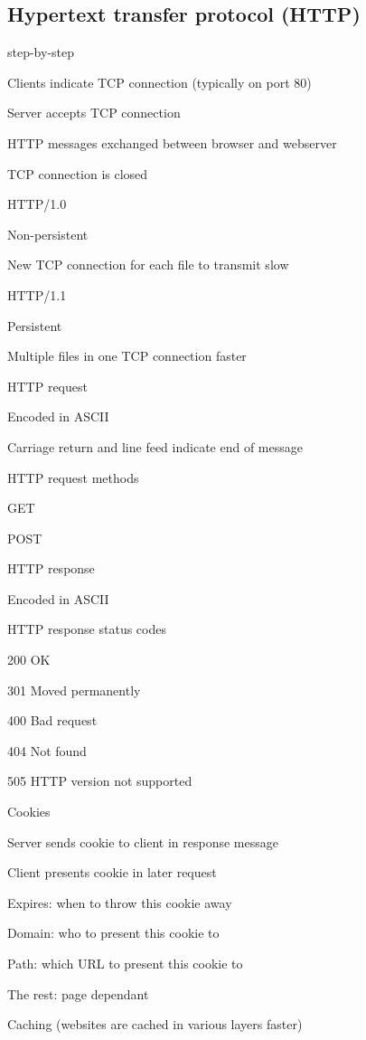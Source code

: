 \subsection{Hypertext transfer protocol (HTTP)}
\enumstart
	\item step-by-step
	\enumstart
		\item Clients indicate TCP connection (typically on port 80)
		\item Server accepts TCP connection
		\item HTTP messages exchanged between browser and webserver
		\item TCP connection is closed
	\enumend
	\item HTTP/1.0
	\enumstart
		\item Non-persistent
		\item New TCP connection for each file to transmit \arrow slow
	\enumend
	\item HTTP/1.1
	\enumstart
		\item Persistent
		\item Multiple files in one TCP connection \arrow faster
	\enumend
	\item HTTP request
	\enumstart
		\item Encoded in ASCII
		\item Carriage return and line feed indicate end of message
		\\ 
	\enumend
	\item HTTP request methods
	\enumstart
		\item GET
		\item POST
	\enumend
	\item HTTP response
	\enumstart
		\item Encoded in ASCII
		\\ 
	\enumend
	\item HTTP response status codes
	\enumstart
		\item 200 OK
		\item 301 Moved permanently
		\item 400 Bad request
		\item 404 Not found
		\item 505 HTTP version not supported
	\enumend
	\item Cookies
	\enumstart
		\item Server sends cookie to client in response message
		\item Client presents cookie in later request
		\\ 
		\item Expires: when to throw this cookie away
		\item Domain: who to present this cookie to
		\item Path: which URL to present this cookie to
		\item The rest: page dependant
	\enumend
	\item Caching (websites are cached in various layers \arrow faster)
\enumend

